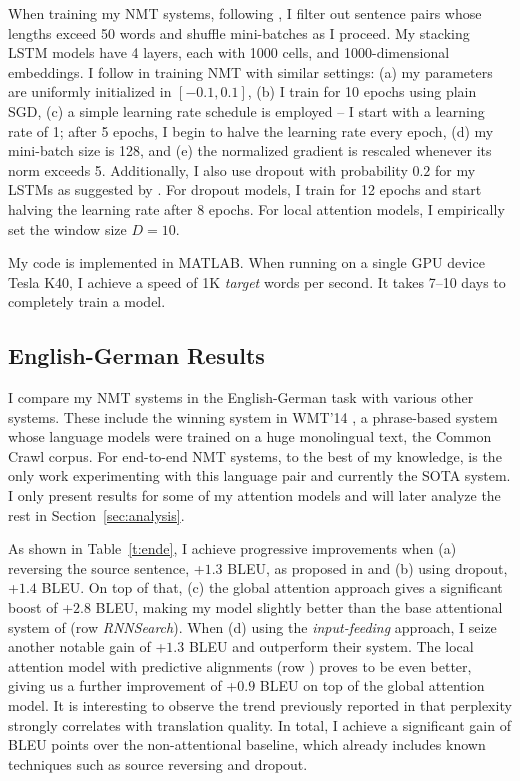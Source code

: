 When training my NMT systems, following \cite{bog15,jean15}, I filter out
sentence pairs whose lengths exceed 50 words and shuffle mini-batches as I
proceed. My stacking LSTM models have 4 layers, each with 1000 cells, and
1000-dimensional embeddings. I follow \cite{sutskever14,luong15} in training
NMT with similar settings: (a) my parameters are uniformly initialized in
$[-0.1, 0.1]$, (b) I train for 10 epochs using plain SGD, (c) a simple learning
rate schedule is employed -- I start with a learning rate of 1; after 5 epochs,
I begin to halve the learning rate every epoch, (d) my mini-batch size is 128,
and (e) the normalized gradient is rescaled whenever its norm exceeds 5.
Additionally, I also use dropout with probability $0.2$ for my LSTMs as suggested by
\cite{zaremba14}. For dropout models, I train for 12 epochs and start halving
the learning rate after 8 epochs. For local
attention models, I empirically set the window size $D=10$.

My code is implemented in MATLAB.
When running on a single GPU device Tesla K40, I achieve a speed of 1K {\it
target} words per second. It takes 7--10 days to completely train a model.

\subsection{English-German Results}
I compare my NMT systems in the English-German task with various other
systems. These include the winning system in WMT'14
\cite{buck14}, a phrase-based system whose language models were trained on a
huge monolingual text, the Common Crawl corpus. For end-to-end NMT systems, to the best of my knowledge, \cite{jean15} is the only work experimenting with this language pair and currently the SOTA system.
I only present results for some of my attention models and will later
analyze the rest in Section~\ref{sec:analysis}. 

\begin{sloppypar}
As shown in Table~\ref{t:ende}, I achieve progressive improvements when
(a) reversing the source sentence, +$1.3$ BLEU, as proposed in \cite{sutskever14}
and (b) using dropout, +$1.4$ BLEU. On top of that, (c) the global
attention approach gives a significant boost of +$2.8$ BLEU, making 
 my model slightly better than the base attentional system of
  (row {\it RNNSearch}). When (d) using the {\it input-feeding}
approach, I seize another notable gain of +$1.3$ BLEU and outperform their
system. The local attention model with predictive alignments (row {\it \localp}) proves
to be even better, giving us a further improvement of +$0.9$ BLEU on top of the
global attention model. 
It is interesting to observe the trend previously reported in
\cite{luong15} that perplexity strongly correlates with translation quality.
In total, I achieve a significant gain of
\attngain{} BLEU points over the non-attentional baseline, which already includes
known techniques such as source reversing and dropout.
\end{sloppypar}

